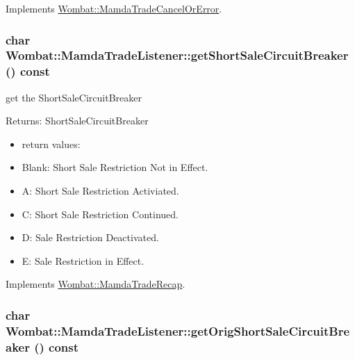 Implements \hyperlink{classWombat_1_1MamdaTradeCancelOrError_5ce3c13612b7670f2517b21d4541c39e}{Wombat::Mamda\-Trade\-Cancel\-Or\-Error}.\hypertarget{classWombat_1_1MamdaTradeListener_8d5969ac94475afb4eeeb8b252106e6f}{
\subsubsection[getShortSaleCircuitBreaker]{\setlength{\rightskip}{0pt plus 5cm}char Wombat::Mamda\-Trade\-Listener::get\-Short\-Sale\-Circuit\-Breaker () const}}
\label{classWombat_1_1MamdaTradeListener_8d5969ac94475afb4eeeb8b252106e6f}


get the Short\-Sale\-Circuit\-Breaker 

\begin{Desc}
\item[Returns:]Short\-Sale\-Circuit\-Breaker \begin{itemize}
\item return values: \item Blank: Short Sale Restriction Not in Effect. \item A: Short Sale Restriction Activiated. \item C: Short Sale Restriction Continued. \item D: Sale Restriction Deactivated. \item E: Sale Restriction in Effect. \end{itemize}
\end{Desc}


Implements \hyperlink{classWombat_1_1MamdaTradeRecap_8fffec973ff9978944e72d9438c6a1cd}{Wombat::Mamda\-Trade\-Recap}.\hypertarget{classWombat_1_1MamdaTradeListener_faa29432bc36076ea95e370398b3cbae}{
\subsubsection[getOrigShortSaleCircuitBreaker]{\setlength{\rightskip}{0pt plus 5cm}char Wombat::Mamda\-Trade\-Listener::get\-Orig\-Short\-Sale\-Circuit\-Breaker () const}}
\label{classWombat_1_1MamdaTradeListener_faa29432bc36076ea95e370398b3cbae}


